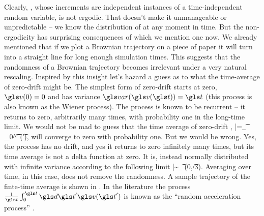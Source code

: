 Clearly, \BM, whose increments are independent instances of a time-independent random variable, is not ergodic. That doesn't make it
unmanageable or unpredictable -- we know the distribution of \BM at any moment in time. But the non-ergodicity
has surprising consequences of which we mention one now. We already mentioned
that if we plot a Brownian trajectory on a piece of paper it will turn into a straight line for long enough
simulation times. This suggests that the randomness of a Brownian trajectory becomes irrelevant
under a very natural rescaling. Inspired by this insight let's hazard a guess as to what 
the time-average of zero-drift \BM might be. The simplest form of zero-drift \BM starts at zero, $\gv(0)=0$
and has variance $\var(\gv(\t))=\t$ (this process is also known as the Wiener process). The process is 
known to be recurrent -- it returns to zero, arbitrarily many times, with probability one in the 
long-time limit. We would not be mad to guess that the time average of zero-drift \BM,
\be
\bar{\gv}=\lim_{\t\to\infty} \int_0^\t \gd\t' \gv(\t'),
\ee
will converge to zero with probability one. But we would be wrong. Yes, the process has no drift, and
yes it returns to zero infinitely many times, but its time average is not a delta function at zero.
It is, instead normally distributed with infinite variance according to the following limit
\be
\bar{\gv}\sim \lim_{\t\to\infty} \mN(0,\t/3).
\ee
Averaging over time, in this case, does not remove the randomness. A sample 
trajectory of the finte-time average is shown in . In the literature the process 
$\frac{1}{\t}\int_0^\t \gd\t' \gv(\t')$ is known as the ``random acceleration process'' \cite{Burkhardt2007}.

